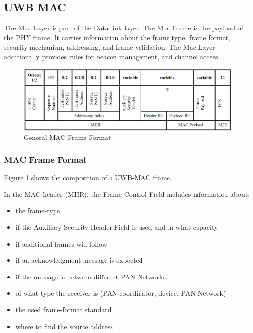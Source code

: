 \subsection{UWB MAC}
\label{sec:UWB MAC}

The Mac Layer is part of the Data link layer.
The Mac Frame is the payload of the PHY frame. It carries information about the frame type, frame format, security mechanism, addressing, and frame validation.
The Mac Layer additionally provides rules for beacon management, and channel access.

\begin{figure}[ht!]
	\centering
	\includegraphics[width=\linewidth]{graphics/general_MAC_Frame_Format.png}
	\caption{General MAC Frame Format \cite{IEEE4-2020-7}}
	\label{f:MAC Frame Format}
\end{figure}


\subsubsection{MAC Frame Format}

Figure \ref{f:MAC Frame Format} shows the composition of a UWB-MAC frame.

In the MAC header (MHR), the Frame Control Field includes information about:

\begin{itemize}
  \item the frame-type
  \item if the Auxiliary Security Header Field is used and in what capacity
  \item if additional frames will follow
  \item if an acknowledgment message is expected
  \item if the message is between different PAN-Networks.
  \item of what type the receiver is (PAN coordinator, device, PAN-Network)
  \item the used frame-format standard
  \item where to find the source address
\end{itemize}

